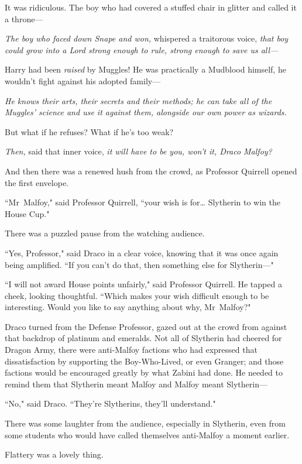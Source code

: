 It was ridiculous. The boy who had covered a stuffed chair in glitter and called it a throne—

\emph{The boy who faced down Snape and won,} whispered a traitorous voice, \emph{that boy could grow into a Lord strong enough to rule, strong enough to save us all—}

Harry had been \emph{raised} by Muggles! He was practically a Mudblood himself, he wouldn't fight against his adopted family—

\emph{He knows their arts, their secrets and their methods; he can take all of the Muggles' science and use it against them, alongside our own power as wizards.}

But what if he refuses? What if he's too weak?

\emph{Then,} said that inner voice, \emph{it will have to be you, won't it, Draco Malfoy?}

And then there was a renewed hush from the crowd, as Professor Quirrell opened the first envelope.

``Mr~Malfoy," said Professor Quirrell, ``your wish is for{\ldots} Slytherin to win the House Cup."

There was a puzzled pause from the watching audience.

``Yes, Professor," said Draco in a clear voice, knowing that it was once again being amplified. ``If you can't do that, then something else for Slytherin—"

``I will not award House points unfairly," said Professor Quirrell. He tapped a cheek, looking thoughtful. ``Which makes your wish difficult enough to be interesting. Would you like to say anything about why, Mr~Malfoy?"

Draco turned from the Defense Professor, gazed out at the crowd from against that backdrop of platinum and emeralds. Not all of Slytherin had cheered for Dragon Army, there were anti-Malfoy factions who had expressed that dissatisfaction by supporting the Boy-Who-Lived, or even Granger; and those factions would be encouraged greatly by what Zabini had done. He needed to remind them that Slytherin meant Malfoy and Malfoy meant Slytherin—

``No," said Draco. ``They're Slytherins, they'll understand."

There was some laughter from the audience, especially in Slytherin, even from some students who would have called themselves anti-Malfoy a moment earlier.

Flattery was a lovely thing.

